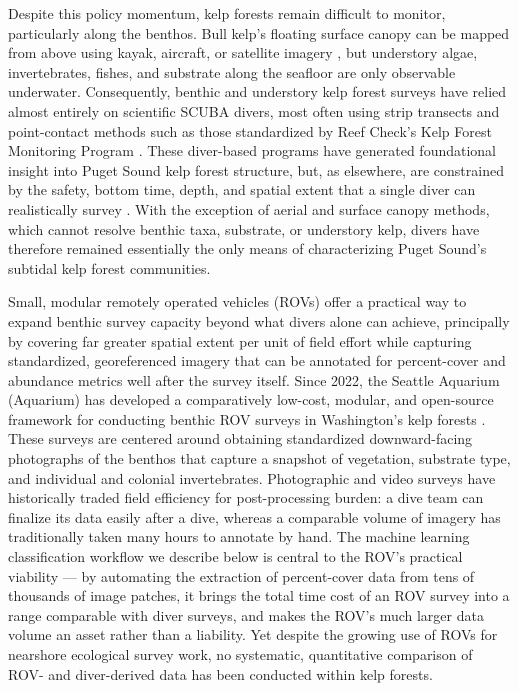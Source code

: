 \documentclass[11pt]{article}
\begin{document}
Despite this policy momentum, kelp forests remain difficult to monitor, particularly along the benthos.
Bull kelp's floating surface canopy can be mapped from above using kayak, aircraft, or satellite imagery \citep{Bell2023, Pfister2018}, but understory algae, invertebrates, fishes, and substrate along the seafloor are only observable underwater.
Consequently, benthic and understory kelp forest surveys have relied almost entirely on scientific SCUBA divers, most often using strip transects and point-contact methods such as those standardized by Reef Check's Kelp Forest Monitoring Program \citep{ReefCheckCalifornia:2021aa, Menge2019, Freiwald2021, Heine2011}.
These diver-based programs have generated foundational insight into Puget Sound kelp forest structure, but, as elsewhere, are constrained by the safety, bottom time, depth, and spatial extent that a single diver can realistically survey \citep{VanRein2009, Levin1992}.
With the exception of aerial and surface canopy methods, which cannot resolve 
benthic taxa, substrate, or understory kelp, divers have therefore remained 
essentially the only means of characterizing Puget Sound's subtidal kelp forest 
communities.

Small, modular remotely operated vehicles (ROVs) offer a practical way to
expand benthic survey capacity beyond what divers alone can achieve,
principally by covering far greater spatial extent per unit of field effort
while capturing standardized, georeferenced imagery that can be annotated for
percent-cover and abundance metrics well after the survey itself.
Since 2022, the Seattle Aquarium (Aquarium) has developed a comparatively
low-cost, modular, and open-source framework for conducting benthic ROV surveys
in Washington's kelp forests \citep{Randell:2026aa}.
These surveys are centered around obtaining standardized downward-facing 
photographs of the benthos that capture a snapshot of vegetation, substrate 
type, and individual and colonial invertebrates.
Photographic and video surveys have historically traded field efficiency for
post-processing burden: a dive team can finalize its data easily after a dive, 
whereas a comparable volume of imagery has traditionally taken many hours to 
annotate by hand.
The machine learning classification workflow we describe below is central to 
the ROV's practical viability --- by automating the extraction of percent-cover 
data from tens of thousands of image patches, it brings the total time cost of 
an ROV survey into a range comparable with diver surveys, and makes the ROV's 
much larger data volume an asset rather than a liability.
Yet despite the growing use of ROVs for nearshore ecological survey work, no
systematic, quantitative comparison of ROV- and diver-derived data has been
conducted within kelp forests.
\end{document}
